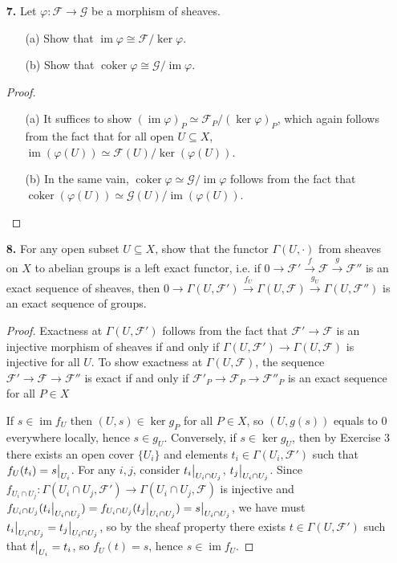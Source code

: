 \documentclass{article}
\newcommand{\fF}{\mathscr{F}}
\newcommand{\fG}{\mathscr{G}}
\DeclareMathOperator{\coker}{coker}
\DeclareMathOperator{\im}{im}
\newcommand\restr[2]{{%
  \left.\kern-\nulldelimiterspace %
  #1 %
  \vphantom{\big|} %
  \right|_{#2} %
}}
\begin{document}
\begin{enumerate} [label=\textbf{\arabic*.}, leftmargin=0em]
\item[\textbf{7.}] Let $\varphi : \fF \to \fG$ be a morphism of sheaves.
\begin{itemize}
    \item[(a)] Show that $\im{\varphi} \cong \fF / \ker{\varphi}$.
    \item[(b)] Show that $\coker{\varphi} \cong \fG / \im{\varphi}$.
\end{itemize}

\begin{proof} $ $ \vspace{0pt}
   \begin{itemize} [leftmargin=0cm]
    \item[(a)] It suffices to show $(\im{\varphi})_P \simeq \fF_P / (\ker{\varphi})_P$, which again follows from the fact that for all open $U \subseteq X$, $\im{(\varphi(U))} \simeq \fF(U) / \ker{(\varphi(U))}$.

    \item[(b)] In the same vain, $\coker{\varphi} \simeq \fG / \im{\varphi}$ follows from the fact that $\coker{(\varphi(U))} \simeq \fG(U) / \im{(\varphi(U))}$.
   \end{itemize} 
\end{proof}

\item[\textbf{8.}] For any open subset $U \subseteq X$, show that the functor $\Gamma(U, \cdot)$ from sheaves on $X$ to abelian groups is a left exact functor, i.e. if $0 \to \fF' \xrightarrow{f} \fF \xrightarrow{g} \fF''$ is an exact sequence of sheaves, then $0 \to \Gamma(U, \fF') \xrightarrow{f_U} \Gamma(U, \fF) \xrightarrow{g_U} \Gamma(U, \fF'')$ is an exact sequence of groups.

\begin{proof}
    Exactness at $\Gamma(U, \fF')$ follows from the fact that $\fF' \to \fF$ is an injective morphism of sheaves if and only if $\Gamma(U, \fF') \to \Gamma(U, \fF)$ is injective for all $U$. To show exactness at $\Gamma(U, \fF)$, the sequence $\fF' \to \fF \to \fF''$ is exact if and only if $\fF'_P \to \fF_P \to \fF''_P$ is an exact sequence for all $P \in X$ 
    
    If $s \in \im{f_U}$ then $(U, s) \in \ker{g_P}$ for all $P \in X$, so $(U, g(s))$ equals to $0$ everywhere locally, hence $s \in g_U$. Conversely, if $s \in \ker{g_U}$, then by Exercise 3 there exists an open cover $\{ U_i \}$ and elements $t_i \in \Gamma(U_i, \fF')$ such that $f_U(t_i) = \restr{s}{U_i}$. For any $i, j$, consider $\restr{t_i}{U_i \cap U_j}$, $\restr{t_j}{U_i \cap U_j}$. Since $f_{U_{i} \cap U_j} : \Gamma(U_i \cap U_j, \fF') \to \Gamma(U_i \cap U_j, \fF)$ is injective and $f_{U_i \cap U_j}(\restr{t_i}{U_i \cap U_j}) = f_{U_i \cap U_j}(\restr{t_{j}}{U_i \cap U_j}) = \restr{s}{U_i \cap U_j}$, we have must $\restr{t_i}{U_i \cap U_j} = \restr{t_j}{U_i \cap U_j}$, so by the sheaf property there exists $t \in \Gamma(U, \fF')$ such that $\restr{t}{U_i} = t_i$, so $f_U(t) = s$, hence $s \in \im{f_U}$.
\end{proof}


\end{enumerate}
\end{document}
